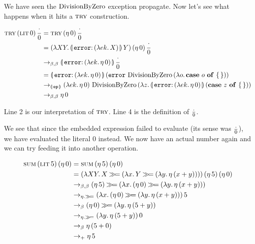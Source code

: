 We have seen the $\operatorname{DivisionByZero}$ exception propagate. Now let's see what
happens when it hits a $\textsc{try}$ construction.

\NoChapterPrefix
\begin{align}
  \app{\trye}{\litec{0}}{\dbze}
  &= \app{\trye}{(\ap{\eta}{0})}{\dbze} \\
  &= \app{(\lam{X Y}{\ap{\banana{\onto{\op{error}}{(\lam{e k}{X})}}}{Y}})}{(\ap{\eta}{0})}{\dbze} \\
  &\to_{\beta,\beta} \ap{\banana{\onto{\op{error}}{(\lam{e k}{\ap{\eta}{0}})}}}{\dbze} \\
  &= \ap{\banana{\onto{\op{error}}{(\lam{e k}{\ap{\eta}{0}})}}}{(\app{\op{error}}{\dbzelong}{(\lam{o}{\absurd{o}})})} \\
  &\to_{\banana{\op{op}}} \app{(\lam{e k}{\ap{\eta}{0}})}{\dbzelong}{(\lam{z}{\ap{\banana{\onto{\op{error}}{(\lam{e k}{\ap{\eta}{0}})}}}{(\absurd{z})}})} \\
  &\to_{\beta,\beta} \ap{\eta}{0}
\end{align}
\setcounter{equation}{0}
\ChapterPrefix

Line 2 is our interpretation of $\textsc{try}$. Line 4 is the definition of
$\frac{\cdot}{0}$.

We see that since the embedded expression failed to evaluate (its sense was
$\frac{\cdot}{0}$), we have evaluated the literal 0 instead. We now have an actual
number again and we can try feeding it into another operation.

\NoChapterPrefix
\begin{align}
  \app{\sume}{\litec{5}}{(\ap{\eta}{0})}
  &= \app{\sume}{(\ap{\eta}{5})}{(\ap{\eta}{0})} \\
  &= \app{(\lam{X Y}{X \hsbind (\lam{x}{Y \hsbind (\lam{y}{\ap{\eta}{(x + y)}})})})}{(\ap{\eta}{5})}{(\ap{\eta}{0})} \\
  &\to_{\beta,\beta} (\ap{\eta}{5}) \hsbind (\lam{x}{(\ap{\eta}{0}) \hsbind (\lam{y}{\ap{\eta}{(x + y)}})}) \\
  &\to_{\eta.\hsbind} \ap{(\lam{x}{(\ap{\eta}{0}) \hsbind (\lam{y}{\ap{\eta}{(x + y)}})})}{5} \\
  &\to_{\beta} (\ap{\eta}{0}) \hsbind (\lam{y}{\ap{\eta}{(5 + y)}}) \\
  &\to_{\eta.\hsbind} \ap{(\lam{y}{\ap{\eta}{(5 + y)}})}{0} \\
  &\to_{\beta} \ap{\eta}{(5 + 0)} \\
  &\to_+ \ap{\eta}{5}
\end{align}
\setcounter{equation}{0}
\ChapterPrefix

